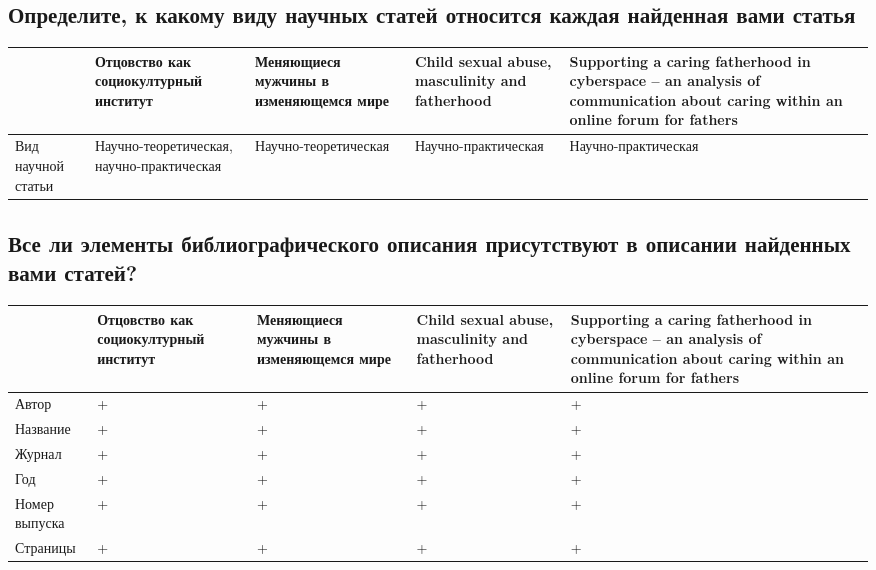 \documentclass{../../common/thesisbyxetex}
\begin{document}
\subsection*{Определите, к какому виду научных статей относится каждая найденная вами статья}
\begin{tabular}[t]{|P{0.14\textwidth}|P{0.17\textwidth}|P{0.17\textwidth}|P{0.17\textwidth}|P{0.17\textwidth}|}
\hline
&
Отцовство как социокултурный институт &
Меняющиеся мужчины в изменяющемся мире &

Child sexual abuse, masculinity and fatherhood &
Supporting a caring fatherhood in cyberspace – an analysis of communication about caring within an online forum for
fathers \\ \hline

Вид научной статьи &
Научно-теоретическая, научно-практическая &
Научно-теоретическая &
Научно-практическая &
Научно-практическая \\ \hline
\end{tabular}

\subsection*{Все ли элементы библиографического описания присутствуют в описании найденных вами статей?}
\begin{tabular}[t]{|P{0.14\textwidth}|P{0.17\textwidth}|P{0.17\textwidth}|P{0.17\textwidth}|P{0.17\textwidth}|}
\hline
&
Отцовство как социокултурный институт &
Меняющиеся мужчины в изменяющемся мире &

Child sexual abuse, masculinity and fatherhood &
Supporting a caring fatherhood in cyberspace – an analysis of communication about caring within an online forum for
fathers \\ \hline

Автор & + & + & + & + \\ \hline
Название & + & + & + & + \\ \hline
Журнал & + & + & + & + \\ \hline
Год & + & + & + & + \\ \hline
Номер выпуска & + & + & + & + \\ \hline
Страницы & + & + & + & + \\ \hline

\end{tabular}
\end{document}

